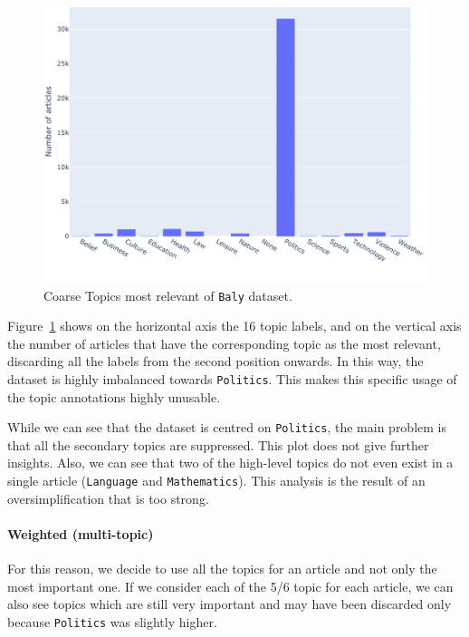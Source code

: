 \begin{figure}[!htbp]
    \centering
    \includegraphics[width=\linewidth]{figures/baly_coarse_first.pdf}
    \caption{Coarse Topics most relevant of \texttt{Baly} dataset.}
    \label{fig:baly_coarse_first}
\end{figure}

Figure~\ref{fig:baly_coarse_first} shows on the horizontal axis the 16 topic labels, and on the vertical axis the number of articles that have the corresponding topic as the most relevant, discarding all the labels from the second position onwards.
In this way, the dataset is highly imbalanced towards \texttt{Politics}. This makes this specific usage of the topic annotations highly unusable.

While we can see that the dataset is centred on \texttt{Politics}, the main problem is that all the secondary topics are suppressed.
This plot does not give further insights.
Also, we can see that two of the high-level topics do not even exist in a single article (\texttt{Language} and \texttt{Mathematics}).
This analysis is the result of an oversimplification that is too strong.

\paragraph{Weighted (multi-topic)}

For this reason, we decide to use all the topics for an article and not only the most important one.
If we consider each of the 5/6 topic for each article, we can also see topics which are still very important and may have been discarded only because \texttt{Politics} was slightly higher.

